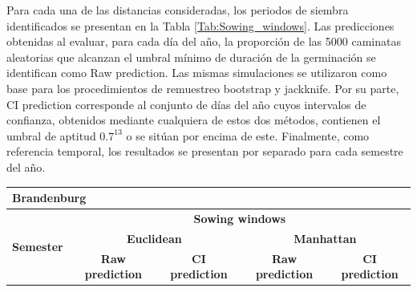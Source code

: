 Para cada una de las distancias consideradas, los periodos de siembra identificados se presentan en la Tabla \ref{Tab:Sowing_windows}. Las predicciones obtenidas al evaluar, para cada día del año, la proporción de las 5000 caminatas aleatorias que alcanzan el umbral mínimo de duración de la germinación se identifican como Raw prediction. Las mismas simulaciones se utilizaron como base para los procedimientos de remuestreo bootstrap y jackknife. Por su parte, CI prediction corresponde al conjunto de días del año cuyos intervalos de confianza, obtenidos mediante cualquiera de estos dos métodos, contienen el umbral de aptitud $0.7^{13}$ o se sitúan por encima de este. Finalmente, como referencia temporal, los resultados se presentan por separado para cada semestre del año.\\


\begin{table}[!h]
	\centering
	\begin{tabular}{cclll}
		\hline
		\multicolumn{5}{l}{\textbf{Brandenburg}}                                                                                                                                                                                                                                                                                                                                 \\ \hline
		\multicolumn{1}{c|}{\multirow{3}{*}{\textbf{Semester}}} & \multicolumn{4}{c}{\textbf{Sowing windows}}                                                                                                                                                                                                                                                                    \\ \cline{2-5} 
		\multicolumn{1}{c|}{}                                   & \multicolumn{2}{c|}{\textbf{Euclidean}}                                                                                                                                                                            & \multicolumn{2}{c}{\textbf{Manhattan}}                                                    \\ \cline{2-5} 
		\multicolumn{1}{c|}{}                                   & \multicolumn{1}{c|}{\textbf{Raw prediction}}                                                    & \multicolumn{1}{c|}{\textbf{CI prediction}}                                                                      & \multicolumn{1}{c|}{\textbf{Raw prediction}} & \multicolumn{1}{c}{\textbf{CI prediction}} \\ \hline

\end{tabular}
\end{table}
